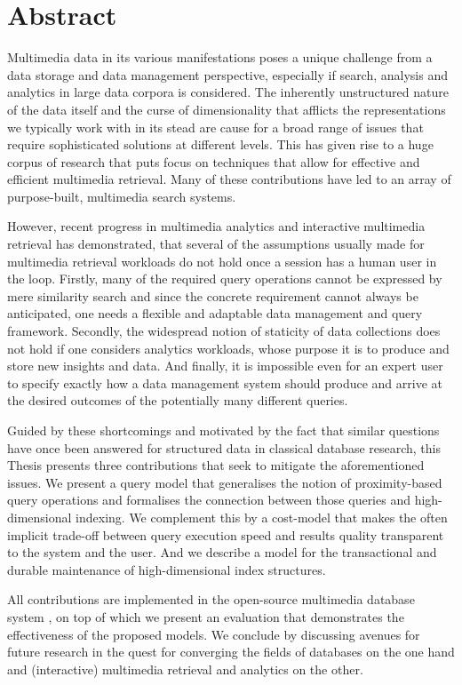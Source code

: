 
\chapter{Abstract}

Multimedia data in its various manifestations poses a unique challenge from a data storage and data management perspective, especially if search, analysis and analytics in large data corpora is considered. The inherently unstructured nature of the data itself and the curse of dimensionality that afflicts the representations we typically work with in its stead are cause for a broad range of issues that require sophisticated solutions at different levels. This has given rise to a huge corpus of research that puts focus on techniques that allow for effective and efficient multimedia retrieval. Many of these contributions have led to an array of purpose-built, multimedia search systems.

However, recent progress in multimedia analytics and interactive multimedia retrieval has demonstrated, that several of the assumptions usually made for multimedia retrieval workloads do not hold once a session has a human user in the loop. Firstly, many of the required query operations cannot be expressed by mere similarity search and since the concrete requirement cannot always be anticipated, one needs a flexible and adaptable data management and query framework. Secondly, the widespread notion of staticity of data collections does not hold if one considers analytics workloads, whose purpose it is to produce and store new insights and data. And finally, it is impossible even for an expert user to specify exactly how a data management system should produce and arrive at the desired outcomes of the potentially many different queries.

Guided by these shortcomings and motivated by the fact that similar questions have once been answered for structured data in classical database research, this Thesis presents three contributions that seek to mitigate the aforementioned issues. We present a query model that generalises the notion of proximity-based query operations and formalises the connection between those queries and high-dimensional indexing. We complement this by a cost-model that makes the often implicit trade-off between query execution speed and results quality transparent to the system and the user. And we describe a model for the transactional and durable maintenance of high-dimensional index structures.

All contributions are implemented in the open-source multimedia database system \cottontail{}, on top of which we present an evaluation that demonstrates the effectiveness of the proposed models. We conclude by discussing avenues for future research in the quest for converging the fields of databases on the one hand and (interactive) multimedia retrieval and analytics on the other.